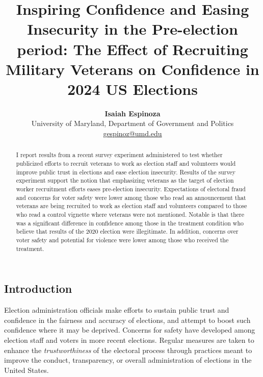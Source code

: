 \documentclass[
  12pt,
  letterpaper,
]{article}
\title{Inspiring Confidence and Easing Insecurity in the Pre-election
period: The Effect of Recruiting Military Veterans on Confidence in 2024
US Elections}
\author{
{\bfseries \normalsize Isaiah Espinoza}%
 \\%
 \small University of Maryland, Department of Government and
Politics \\%
{\footnotesize \url{gespinoz@umd.edu}} \\\vspace{10pt}
}
\date{}
\begin{document}
\renewcommand{\abstractname}{Abstract.}


\maketitle
\begin{abstract}
I report results from a recent survey experiment administered to test
whether publicized efforts to recruit veterans to work as election staff
and volunteers would improve public trust in elections and ease election
insecurity. Results of the survey experiment support the notion that
emphasizing veterans as the target of election worker recruitment
efforts eases pre-election insecurity. Expectations of electoral fraud
and concerns for voter safety were lower among those who read an
announcement that veterans are being recruited to work as election staff
and volunteers compared to those who read a control vignette where
veterans were not mentioned. Notable is that there was a significant
difference in confidence among those in the treatment condition who
believe that results of the 2020 election were illegitimate. In
addition, concerns over voter safety and potential for violence were
lower among those who received the treatment.
\end{abstract}


\newpage{}

\subsection{Introduction}\label{introduction}

Election administration officials make efforts to sustain public trust
and confidence in the fairness and accuracy of elections, and attempt to
boost such confidence where it may be deprived. Concerns for safety have
developed among election staff and voters in more recent elections.
Regular measures are taken to enhance the \emph{trustworthiness} of the
electoral process through practices meant to improve the conduct,
transparency, or overall administration of elections in the United
States.
\end{document}
